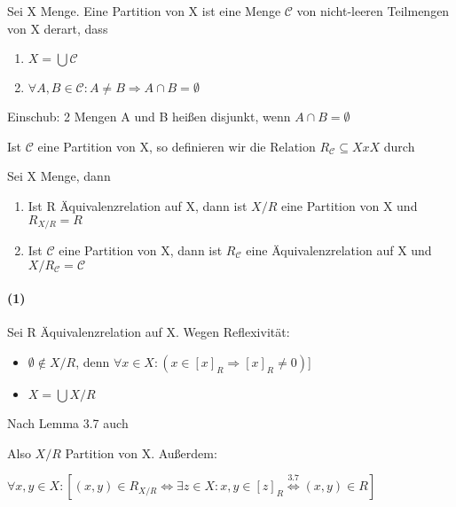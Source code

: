 \documentclass{../../meta/tudscript}
\begin{document}

Sei X Menge. Eine Partition von X ist eine Menge \(\mathscr{C}\) von
nicht-leeren Teilmengen von X derart, dass

\begin{enumerate}
\def\labelenumi{\arabic{enumi})}

\item
  \(X = \bigcup \mathscr{C}\)
\item
  \(\forall A, B \in \mathscr{C}: A\neq B \Rightarrow A \cap B = \emptyset\)
\end{enumerate}

Einschub: 2 Mengen A und B heißen disjunkt, wenn
\(A \cap B = \emptyset\)

Ist \(\mathscr{C}\) eine Partition von X, so definieren wir die Relation
\(R_\mathscr{C}\subseteq X x X\) durch


Sei X Menge, dann

\begin{enumerate}

\item
  Ist R Äquivalenzrelation auf X, dann ist \(X/R\) eine Partition von X
  und \(R_{X/R} = R\)
\item
  Ist \(\mathscr{C}\) eine Partition von X, dann ist \(R_\mathscr{C}\)
  eine Äquivalenzrelation auf X und \(X/R_\mathscr{C}= \mathscr{C}\)
\end{enumerate}


\paragraph{(1)}

Sei R Äquivalenzrelation auf X. Wegen Reflexivität:

\begin{itemize}

\item
  \(\emptyset \not\in X/R\), denn
  \(\forall x \in X: (x \in [x]_R \Rightarrow[x]_R \neq 0)\){]}
\item
  \(X = \bigcup X/R\)
\end{itemize}

Nach Lemma 3.7 auch

Also \(X/R\) Partition von X. Außerdem:

\(\forall x,y \in X: [ (x,y) \in R_{X/R} \iff \exists z \in X: x,y \in [z]_R \overset{3.7}{\iff} (x,y) \in R ]\)
\end{document}
